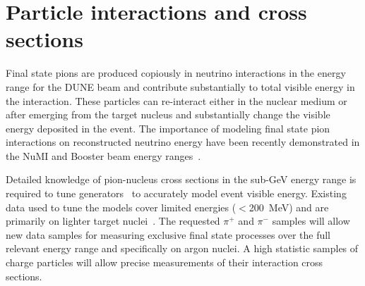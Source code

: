 
\section{Particle interactions and cross sections}



Final state pions are produced copiously in neutrino interactions in the energy range for the DUNE beam  and contribute 
substantially to total visible energy in the interaction.
These particles can re-interact either in the nuclear medium or after emerging from the target nucleus
and substantially change the visible energy deposited in the event. 
The importance of modeling final state pion interactions on reconstructed neutrino energy have 
been recently demonstrated in the NuMI and Booster beam energy ranges~\cite{miniboonefsi, minervafsi}. 

Detailed knowledge of pion-nucleus cross sections in the sub-GeV energy range is required
to tune generators~\cite{genie} to accurately model event visible energy. 
Existing data used to tune the models cover limited energies ($<$200~MeV) and are primarily on lighter target nuclei~\cite{fsirev}.
The requested $\pi^+$ and $\pi^-$ samples will allow new data samples for measuring
exclusive final state processes over the full relevant energy range and specifically on argon nuclei. 
A high statistic samples of charge particles will allow precise measurements of their interaction cross sections.

